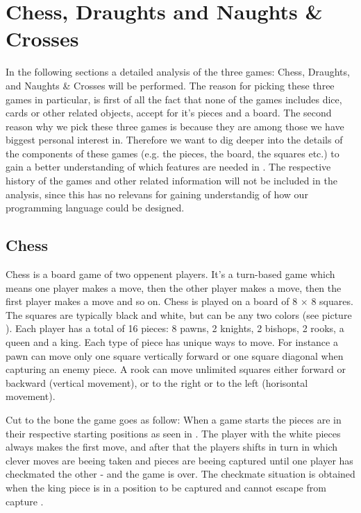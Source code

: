 \section{Chess, Draughts and Naughts \& Crosses}

In the following sections a detailed analysis of the three games: Chess, Draughts, and Naughts \& Crosses will be performed. The reason for picking these three games in particular, is first of all the fact that none of the games includes dice, cards or other related objects, accept for it's pieces and a board. The second reason why we pick these three games is because they are among those we have biggest personal interest in. Therefore we want to dig deeper into the details of the components of these games (e.g. the pieces, the board, the squares etc.) to gain a better understanding of which features are needed in \productname. The respective history of the games and other related information will not be included in the analysis, since this has no relevans for gaining understandig of how our programming language could be designed.  

\subsection{Chess}
Chess is a board game of two oppenent players. It's a turn-based game which means one player makes a move, then the other player makes a move, then the first player makes a move and so on. Chess is played on a board of 8 $\times$ 8 squares. The squares are typically black and white, but can be any two colors (see picture ). Each player has a total of 16 pieces: 8 pawns, 2 knights, 2 bishops, 2 rooks, a queen and a king. Each type of piece has unique ways to move. For instance a pawn can move only one square vertically forward or one square diagonal when capturing an enemy piece. A rook can move unlimited squares either forward or backward (vertical movement), or to the right or to the left (horisontal movement). 

Cut to the bone the game goes as follow: When a game starts the pieces are in their respective starting positions as seen in . The player with the white pieces always makes the first move, and after that the players shifts in turn in which clever moves are beeing taken and pieces are beeing captured until one player has checkmated the other - and the game is over. The checkmate situation is obtained when the king piece is in a position to be captured and cannot escape from capture \cite{chessrules}.

